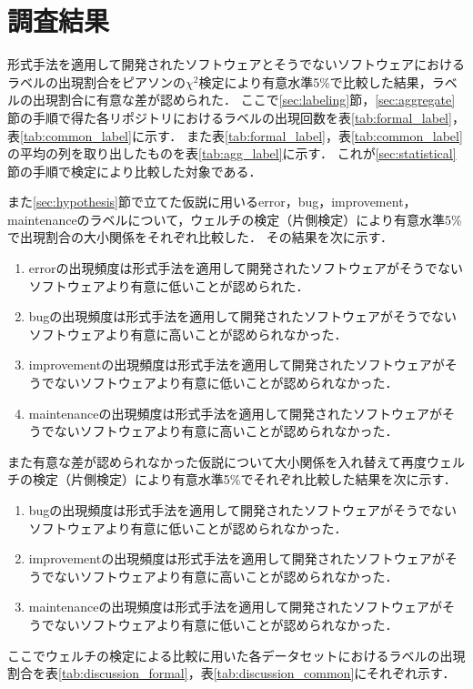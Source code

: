 \documentclass[main]{subfiles}
\begin{document}
\chapter{調査結果}

形式手法を適用して開発されたソフトウェアとそうでないソフトウェアにおけるラベルの出現割合をピアソンの\(\chi^2\)検定により有意水準5\%で比較した結果，ラベルの出現割合に有意な差が認められた．
ここで\ref{sec:labeling}節，\ref{sec:aggregate}節の手順で得た各リポジトリにおけるラベルの出現回数を表\ref{tab:formal_label}，表\ref{tab:common_label}に示す．
また表\ref{tab:formal_label}，表\ref{tab:common_label}の平均の列を取り出したものを表\ref{tab:agg_label}に示す．
これが\ref{sec:statistical}節の手順で検定により比較した対象である．



また\ref{sec:hypothesis}節で立てた仮説に用いるerror，bug，improvement，maintenanceのラベルについて，ウェルチの検定（片側検定）により有意水準5\%で出現割合の大小関係をそれぞれ比較した．
その結果を次に示す．

\begin{enumerate}
	\item errorの出現頻度は形式手法を適用して開発されたソフトウェアがそうでないソフトウェアより有意に低いことが認められた．
	\item bugの出現頻度は形式手法を適用して開発されたソフトウェアがそうでないソフトウェアより有意に高いことが認められなかった．
	\item improvementの出現頻度は形式手法を適用して開発されたソフトウェアがそうでないソフトウェアより有意に低いことが認められなかった．
	\item maintenanceの出現頻度は形式手法を適用して開発されたソフトウェアがそうでないソフトウェアより有意に高いことが認められなかった．
\end{enumerate}

また有意な差が認められなかった仮説について大小関係を入れ替えて再度ウェルチの検定（片側検定）により有意水準5\%でそれぞれ比較した結果を次に示す．

\begin{enumerate}
	\item bugの出現頻度は形式手法を適用して開発されたソフトウェアがそうでないソフトウェアより有意に低いことが認められなかった．
	\item improvementの出現頻度は形式手法を適用して開発されたソフトウェアがそうでないソフトウェアより有意に高いことが認められなかった．
	\item maintenanceの出現頻度は形式手法を適用して開発されたソフトウェアがそうでないソフトウェアより有意に低いことが認められなかった．
\end{enumerate}

ここでウェルチの検定による比較に用いた各データセットにおけるラベルの出現割合を表\ref{tab:discussion_formal}，表\ref{tab:discussion_common}にそれぞれ示す．


\end{document}
